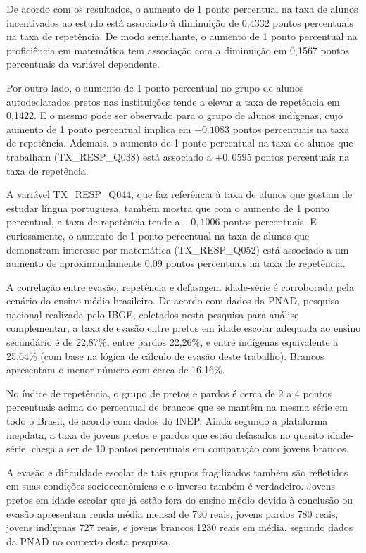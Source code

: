 \documentclass[english, spanish, brazilian]{RBIEarticle} %
\begin{document}
De acordo com os resultados, o aumento de 1 ponto percentual na taxa de alunos incentivados ao estudo está associado à diminuição de 0,4332 pontos percentuais na taxa de repetência. De modo semelhante, o aumento de 1 ponto percentual na proficiência em matemática tem associação com a diminuição em 0,1567 pontos percentuais da variável dependente.

Por outro lado, o aumento de 1 ponto percentual no grupo de alunos autodeclarados pretos nas instituições tende a elevar a taxa de repetência em 0,1422. E o mesmo pode ser observado para o grupo de alunos indígenas, cujo aumento de 1 ponto percentual implica em $+0.1083$ pontos percentuais na taxa de repetência. Ademais, o aumento de 1 ponto percentual na taxa de alunos que trabalham (TX\_RESP\_Q038) está associado a $+0,0595$ pontos percentuais na taxa de repetência.

A variável TX\_RESP\_Q044, que faz referência à taxa de alunos que gostam de estudar língua portuguesa, também mostra que com o aumento de 1 ponto percentual, a taxa de repetência tende a $-0,1006$ pontos percentuais. E curiosamente, o aumento de 1 ponto percentual na taxa de alunos que demonstram interesse por matemática (TX\_RESP\_Q052) está associado a um aumento de aproximandamente 0,09 pontos percentuais na taxa de repetência.

A correlação entre evasão, repetência e defasagem idade-série é corroborada pela cenário do ensino médio brasileiro. De acordo com dados da PNAD, pesquisa nacional realizada pelo IBGE, coletados nesta pesquisa para análise complementar, a taxa de evasão entre pretos em idade escolar adequada ao ensino secundário é de 22,87\%, entre pardos 22,26\%, e entre indígenas equivalente a 25,64\% (com base na lógica de cálculo de evasão deste trabalho). Brancos apresentam o menor número com cerca de 16,16\%. 

No índice de repetência, o grupo de pretos e pardos é cerca de 2 a 4 pontos percentuais acima do percentual de brancos que se mantêm na mesma série em todo o Brasil, de acordo com dados do INEP. Ainda segundo a plataforma inepdata, a taxa de jovens pretos e pardos que estão defasados no quesito idade-série, chega a ser de 10 pontos percentuais em comparação com jovens brancos.

A evasão e dificuldade escolar de tais grupos fragilizados também são refletidos em suas condições socioeconômicas e o inverso também é verdadeiro. Jovens pretos em idade escolar que já estão fora do ensino médio devido à conclusão ou evasão apresentam renda média mensal de 790 reais, jovens pardos 780 reais, jovens indígenas 727 reais, e jovens brancos 1230 reais em média, segundo dados da PNAD no contexto desta pesquisa.
\end{document}
